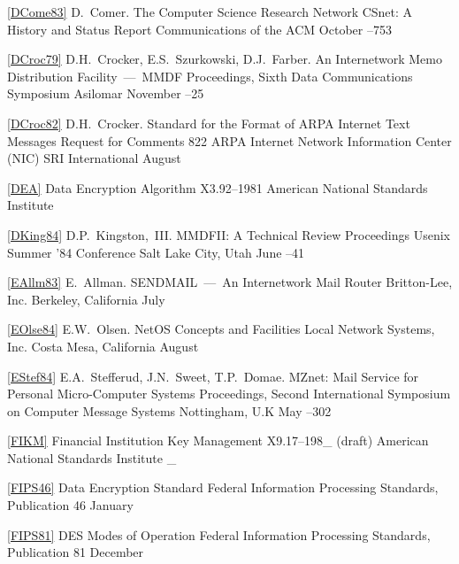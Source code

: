 

\ref{DCome83}
\by D.~Comer.
\paper The Computer Science Research Network CSnet:
A History and Status Report
\journal Communications of the ACM
\month October
--753
\endref

\ref{DCroc79}
\by D.H.~Crocker, E.S.~Szurkowski, D.J.~Farber.
\paper An Internetwork Memo Distribution Facility~---~MMDF
\inbook Proceedings,
Sixth Data Communications Symposium
\publaddr Asilomar
\month November
--25
\endref

\ref{DCroc82}
\by D.H.~Crocker.
\paper Standard for the Format of ARPA Internet Text Messages
\paperinfo Request for Comments 822
\other
\publ ARPA Internet Network Information Center (NIC)
\publaddr SRI International
\month August
\endref

\ref{DEA}
\book Data Encryption Algorithm
\bookinfo X3.92--1981
\publ American National Standards Institute
\endref

\ref{DKing84}
\by D.P.~Kingston,~III.
\paper MMDFII: A Technical Review
\inbook Proceedings
Usenix Summer '84 Conference
\publaddr Salt Lake City, Utah
\month June
--41
\endref

\ref{EAllm83}
\by E.~Allman.
\paper SENDMAIL~---~An Internetwork Mail Router
\other
\publ Britton-Lee, Inc.
\publaddr Berkeley, California
\month July
\endref

\ref{EOlse84}
\by E.W.~Olsen.
\paper NetOS Concepts and Facilities
\other
\publ Local Network Systems, Inc.
\publaddr Costa Mesa, California
\month August
\endref

\ref{EStef84}
\by E.A.~Stefferud, J.N.~Sweet, T.P.~Domae.
\paper MZnet: Mail Service for Personal Micro-Computer Systems
\inbook Proceedings,
Second International Symposium on Computer Message Systems
\publaddr Nottingham, U.K
\month May
--302
\endref

\ref{FIKM}
\book Financial Institution Key Management
\bookinfo X9.17--198\_ (draft)
\publ American National Standards Institute
\_
\endref

\ref{FIPS46}
\book Data Encryption Standard
\bookinfo Federal Information Processing Standards,
Publication 46
\month January
\endref

\ref{FIPS81}
\book DES Modes of Operation
\bookinfo Federal Information Processing Standards,
Publication 81
\month December
\endref

